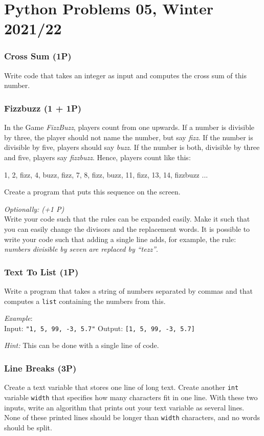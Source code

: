 \documentclass[
	english,
	fontsize=10pt,
	parskip=half,
	titlepage=true,
	DIV=12
]{scrartcl}
\newcommand*{\inPy}[1]{\texttt{#1}}
\begin{document}
\part*{Python Problems 05, Winter 2021/22}
\section{Cross Sum (1\;P)}
Write code that takes an integer as input and computes the cross sum of this number.


\section{Fizzbuzz (1 + 1\;P)}
In the Game \emph{FizzBuzz}, players count from one upwards. If a number is divisible by three, the player should not name the number, but say \emph{fizz}. If the number is divisible by five, players should say \emph{buzz}. If the number is both, divisible by three and five, players say \emph{fizzbuzz}. Hence, players count like this:
\begin{center}
	1, 2, fizz, 4, buzz, fizz, 7, 8, fizz, buzz, 11, fizz, 13, 14, fizzbuzz ...
\end{center}

Create a program that puts this sequence on the screen.

\emph{Optionally: (+1 P)}\\
Write your code such that the rules can be expanded easily. Make it such that you can easily change the divisors and the replacement words. It is possible to write your code such that adding a single line adds, for example, the rule: \emph{numbers divisible by seven are replaced by \enquote{tezz}}.


\section{Text To List (1\;P)}
Write a program that takes a string of numbers separated by commas and that computes a \inPy{list} containing the numbers from this.

\emph{Example}:\\
Input: \inPy{"1, 5, 99, -3, 5.7"} \tab
Output: \inPy{[1, 5, 99, -3, 5.7]}

\emph{Hint:} This can be done with a single line of code.


\section{Line Breaks (3\;P)}
Create a text variable that stores one line of long text. Create another \inPy{int} variable \texttt{width} that specifies how many characters fit in one line. With these two inputs, write an algorithm that prints out your text variable as several lines. None of these printed lines should be longer than \texttt{width} characters, and no words should be split.
\end{document}
